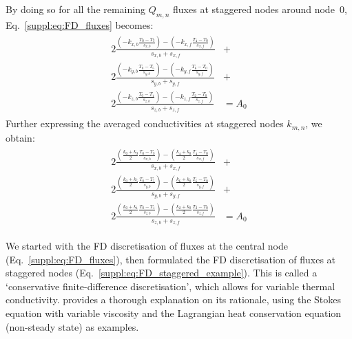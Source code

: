 By doing so for all the remaining $Q_{m,n}$ fluxes at staggered nodes around node~$0$, Eq.~\ref{suppl:eq:FD_fluxes} becomes:
\begin{align}
\begin{split}
    \label{suppl:eq:FD_fluxes_complete}
    2 \frac{
            \left( -k_{x,b} \displaystyle \frac{T_0 - T_3}{s_{x,b}} \right ) -
            \left( -k_{x,f} \displaystyle \frac{T_4 - T_0}{s_{x,f}} \right )
        }{s_{x,b} + s_{x,f}} &+ \\[1ex]
    2 \frac{
            \left( -k_{y,b} \displaystyle \frac{T_0 - T_5}{s_{y,b}} \right ) -
            \left( -k_{y,f} \displaystyle \frac{T_6 - T_0}{s_{y,f}} \right )
        }{s_{y,b} + s_{y,f}} &+ \\[1ex]
    2 \frac{
            \left( -k_{z,b} \displaystyle \frac{T_0 - T_1}{s_{z,b}} \right ) -
            \left( -k_{z,f} \displaystyle \frac{T_2 - T_0}{s_{z,f}} \right )
        }{s_{z,b} + s_{z,f}} &= A_0
\end{split}
\end{align}
Further expressing the averaged conductivities at staggered nodes $k_{m,n}$, we obtain:
\begin{align}
\begin{split}    
    \label{suppl:eq:FD_fluxes_complete_k}
    2 \frac{
            \left(
                \displaystyle \frac{k_0 + k_3}{2}
                \displaystyle \frac{T_0 - T_3}{s_{x,b}}
            \right ) -
            \left(
                \displaystyle \frac{k_4 + k_0}{2}
                \displaystyle \frac{T_4 - T_0}{s_{x,f}}
            \right )
        }{s_{x,b} + s_{x,f}} &+ \\[1ex]
    2 \frac{
            \left(
                \displaystyle \frac{k_0 + k_5}{2}
                \displaystyle \frac{T_0 - T_5}{s_{y,b}} \right ) -
            \left(
                \displaystyle \frac{k_6 + k_0}{2}
                \displaystyle \frac{T_6 - T_0}{s_{y,f}}
            \right )
        }{s_{y,b} + s_{y,f}} &+ \\[1ex]
    2 \frac{
            \left(
                \displaystyle \frac{k_0 + k_1}{2}
                \displaystyle \frac{T_0 - T_1}{s_{z,b}}
            \right ) -
            \left(
                \displaystyle \frac{k_2 + k_0}{2}
                \displaystyle \frac{T_2 - T_0}{s_{z,f}}
            \right )
        }{s_{z,b} + s_{z,f}} &= A_0
\end{split}
\end{align}

We started with the FD discretisation of fluxes at the central node (Eq.~\ref{suppl:eq:FD_fluxes}), then formulated the FD discretisation of fluxes at staggered nodes (Eq.~\ref{suppl:eq:FD_staggered_example}).
This is called a `conservative finite-difference discretisation', which allows for variable thermal conductivity.
\textcite{Gerya2010} provides a thorough explanation on its rationale, using the Stokes equation with variable viscosity and the Lagrangian heat conservation equation (non-steady state) as examples.

